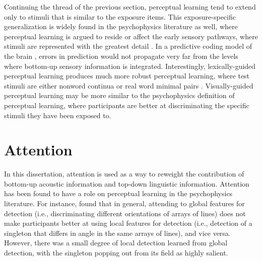 Continuing the thread of the previous section, perceptual learning tend to extend only to stimuli that is similar to the exposure items.
This exposure-specific generalization is widely found in the psychophysics literature as well, where perceptual learning is argued to reside or affect the early sensory pathways, where stimuli are represented with the greatest detail \citep{Gilbert2001}.  
In a predictive coding model of the brain \citep{Clark2013}, errors in prediction would not propagate very far from the levels where bottom-up sensory information is integrated.  
Interestingly, lexically-guided perceptual learning produces much more robust perceptual learning, where test stimuli are either nonword continua \citep{Norris2003} or real word minimal pairs \citep{Reinisch2013}.  
Visually-guided perceptual learning may be more similar to the psychophysics definition of perceptual learning, where participants are better at discriminating the specific stimuli they have been exposed to.

\section{Attention}
\label{sec:attention}

In this dissertation, attention is used as a way to reweight the contribution of bottom-up acoustic information and top-down linguistic information.
Attention has been found to have a role on perceptual learning in the psychophysics literature.  
For instance, \citet{Ahissar1993} found that in general, attending to global features for detection (i.e., discriminating different orientations of arrays of lines) does not make participants better at using local features for detection (i.e., detection of a singleton that differs in angle in the same arrays of lines), and vice versa.  However, there was a small degree of local detection learned from global detection, with the singleton popping out from its field as highly salient.

